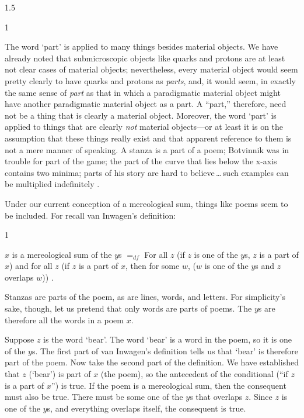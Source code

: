 \documentclass[11pt]{article}
\newenvironment{squote}{%
\begin{spacing}{1}
\begin{list}{}{%
\setlength{\labelwidth}{0pt}%
\rightmargin\leftmargin%
}
\item\relax
}{%
\end{list}%
\end{spacing}
}
\begin{document}
\begin{spacing}{1.5}
\begin{squote}
The word `part' is applied to many things besides material objects.
We have already noted that submicroscopic objects like quarks and
protons are at least not clear cases of material objects;
nevertheless, every material object would seem pretty clearly to have
quarks and protons as \emph{parts}, and, it would seem, in exactly the
same sense of \emph{part} as that in which a paradigmatic material
object might have another paradigmatic material object as a part.  A
``part,'' therefore, need not be a thing that is clearly a material
object.  Moreover, the word `part' is applied to things that are
clearly \emph{not} material objects---or at least it is on the
assumption that these things really exist and that apparent reference
to them is not a mere manner of speaking.  A stanza is a part of a
poem; Botvinnik was in trouble for part of the game; the part of the
curve that lies below the x-axis contains two minima; parts of his
story are hard to believe\,\ldots\,such examples can be multiplied
indefinitely \citeyearpar[18--19]{inwagen1995}.
\end{squote}

Under our current conception of a mereological sum, things like poems
seem to be included.  For recall van Inwagen's definition:

\begin{squote}
$x$ is a mereological sum of the $y$s $=_{df}$ For all $z$ (if $z$ is
  one of the $y$s, $z$ is a part of $x$) and for all $z$ (if $z$ is a
  part of $x$, then for some $w$, ($w$ is one of the $y$s and $z$
  overlaps $w$)) \citeyearpar[618--619]{inwagen2006}.
\end{squote}

Stanzas are parts of the poem, as are lines, words, and letters.  For
simplicity's sake, though, let us pretend that only words are parts of
poems.  The $y$s are therefore all the words in a poem $x$.

Suppose $z$ is the word `bear'.  The word `bear' is a word in the
poem, so it is one of the $y$s.  The first part of van Inwagen's
definition tells us that `bear' is therefore part of the poem.  Now
take the second part of the definition.  We have established that $z$
(`bear') is part of $x$ (the poem), so the antecedent of the
conditional (``if $z$ is a part of $x$'') is true.  If the poem is a
mereological sum, then the consequent must also be true.  There must
be some one of the $y$s that overlaps $z$.  Since $z$ is one of the
$y$s, and everything overlaps itself, the consequent is true.


\end{spacing}
\end{document}
